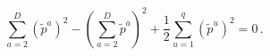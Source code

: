 \begin{equation}
\label{uequation}
\sum_{a=2}^D(\tilde p^a)^2  - \left(\sum_{a=2}^D\tilde p^a\right)^2
+\frac{1}{2}\sum_{u=1}^q (\tilde p^u)^2=0 \, .
\end{equation} 
